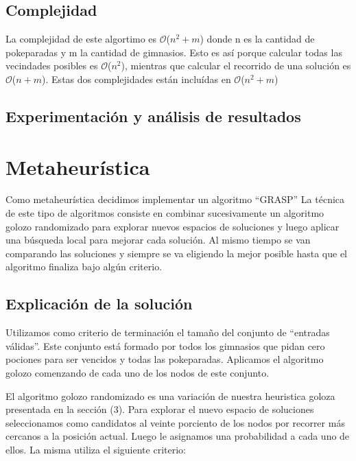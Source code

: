 \documentclass[spanish,12pt]{article}
\begin{document}
\subsection{Complejidad}
La complejidad de este algortimo es $\mathcal{O}$($n^{2}+m$) donde n es la cantidad de pokeparadas y m la cantidad de gimnasios. Esto es así porque calcular todas las vecindades posibles es $\mathcal{O}$($n^{2}$), mientras que calcular el recorrido de una solución es $\mathcal{O}$($n+m$). Estas dos complejidades están incluídas en $\mathcal{O}$($n^{2}+m$)

\subsection{Experimentación y análisis de resultados}



\section{Metaheurística}

Como metaheurística decidimos implementar un algoritmo ``GRASP''
La técnica de este tipo de algoritmos consiste en combinar sucesivamente un algoritmo golozo randomizado para explorar nuevos espacios de soluciones y luego aplicar una búsqueda local para mejorar cada solución. Al mismo tiempo se van comparando las soluciones y siempre se va eligiendo la mejor posible hasta que el algoritmo finaliza bajo algún criterio.

\subsection{Explicación de la solución}

Utilizamos como criterio de terminación el tamaño del conjunto de ``entradas válidas''. Este conjunto está formado por todos los gimnasios que pidan cero pociones para ser vencidos y todas las pokeparadas. Aplicamos el algoritmo golozo comenzando de cada uno de los nodos de este conjunto. 

El algoritmo golozo randomizado es una variación de nuestra heuristica goloza presentada en la sección (3). %
Para explorar el nuevo espacio de soluciones seleccionamos como candidatos al veinte porciento de los nodos por recorrer más cercanos a la posición actual.
Luego le asignamos una probabilidad a cada uno de ellos. La misma utiliza el siguiente criterio:
\end{document}
